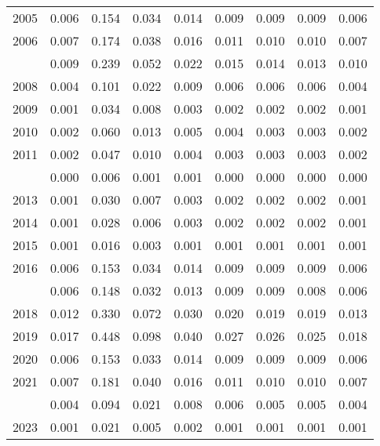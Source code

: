 \documentclass[
]{article}
\begin{document}
\begin{longtable}[t]{lrrrrrrrr}
2005 & 0.006 & 0.154 & 0.034 & 0.014 & 0.009 & 0.009 & 0.009 & 0.006\\
2006 & 0.007 & 0.174 & 0.038 & 0.016 & 0.011 & 0.010 & 0.010 & 0.007\\
\addlinespace
2007 & 0.009 & 0.239 & 0.052 & 0.022 & 0.015 & 0.014 & 0.013 & 0.010\\
2008 & 0.004 & 0.101 & 0.022 & 0.009 & 0.006 & 0.006 & 0.006 & 0.004\\
2009 & 0.001 & 0.034 & 0.008 & 0.003 & 0.002 & 0.002 & 0.002 & 0.001\\
2010 & 0.002 & 0.060 & 0.013 & 0.005 & 0.004 & 0.003 & 0.003 & 0.002\\
2011 & 0.002 & 0.047 & 0.010 & 0.004 & 0.003 & 0.003 & 0.003 & 0.002\\
\addlinespace
2012 & 0.000 & 0.006 & 0.001 & 0.001 & 0.000 & 0.000 & 0.000 & 0.000\\
2013 & 0.001 & 0.030 & 0.007 & 0.003 & 0.002 & 0.002 & 0.002 & 0.001\\
2014 & 0.001 & 0.028 & 0.006 & 0.003 & 0.002 & 0.002 & 0.002 & 0.001\\
2015 & 0.001 & 0.016 & 0.003 & 0.001 & 0.001 & 0.001 & 0.001 & 0.001\\
2016 & 0.006 & 0.153 & 0.034 & 0.014 & 0.009 & 0.009 & 0.009 & 0.006\\
\addlinespace
2017 & 0.006 & 0.148 & 0.032 & 0.013 & 0.009 & 0.009 & 0.008 & 0.006\\
2018 & 0.012 & 0.330 & 0.072 & 0.030 & 0.020 & 0.019 & 0.019 & 0.013\\
2019 & 0.017 & 0.448 & 0.098 & 0.040 & 0.027 & 0.026 & 0.025 & 0.018\\
2020 & 0.006 & 0.153 & 0.033 & 0.014 & 0.009 & 0.009 & 0.009 & 0.006\\
2021 & 0.007 & 0.181 & 0.040 & 0.016 & 0.011 & 0.010 & 0.010 & 0.007\\
\addlinespace
2022 & 0.004 & 0.094 & 0.021 & 0.008 & 0.006 & 0.005 & 0.005 & 0.004\\
2023 & 0.001 & 0.021 & 0.005 & 0.002 & 0.001 & 0.001 & 0.001 & 0.001\\*
\end{longtable}
\end{document}
